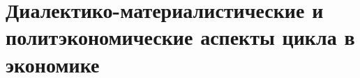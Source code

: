 \chapter{Диалектико-материалистические и политэкономические аспекты цикла в экономике}
\label{ch:ch2}


